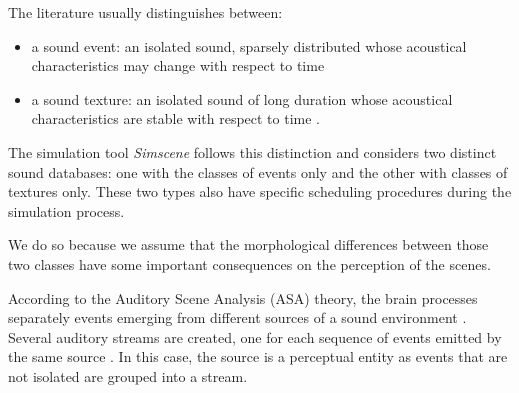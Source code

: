 \documentclass[preprint,12pt]{elsarticle}
\newcommand{\ie}{\emph{i.\,e.}}
\begin{document}
The literature usually distinguishes between:
\begin{itemize}
\item {a sound event}: an isolated sound, sparsely distributed whose acoustical characteristics may change with respect to time
\item {a sound texture}: an isolated sound of long duration whose acoustical characteristics are stable with respect to time \cite{saint1995classification}.
\end{itemize}

The simulation tool \emph{Simscene} follows this distinction and considers two distinct sound databases: one with the classes of events only and the other with classes of textures only. These two types also have specific scheduling procedures during the simulation process.



We do so because we assume that the morphological differences between those two classes have some important consequences on the perception of the scenes.


According to the Auditory Scene Analysis (ASA) theory, the brain processes separately events emerging from different sources of a sound environment \cite{bregman1994auditory}. Several auditory streams are created, one for each sequence of events emitted by the same source \cite{carlyon2004brain}. In this case, the source is a perceptual entity as events that are not isolated are grouped into a stream.

\end{document}
